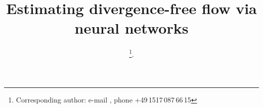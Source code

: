 \documentclass[pamm,a4paper,fleqn]{w-art}
\begin{document}

\TitleLanguage[EN]
\title[Divergence-free neural networks]{Estimating divergence-free flow via
  neural networks}

\author{ %
\footnote{Corresponding author: e-mail , 
     phone +49\,1517\,087\,66\,15}.} 
\author{ }
\author{ }
\author{ }
\end{document}
